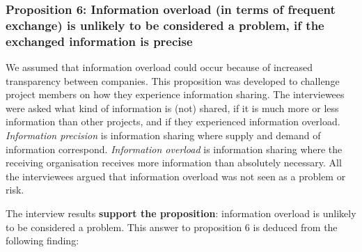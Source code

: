 \vspace{.2cm}
\subsubsection{Proposition 6: Information overload (in terms of frequent exchange) is unlikely to be considered a problem, if the exchanged information is precise}


We assumed that information overload could occur because of increased transparency between companies. This proposition was developed to challenge project members on how they experience information sharing. The interviewees were asked what kind of information is (not) shared, if it is much more or less information than other projects, and if they experienced information overload. {\em Information precision} is information sharing where supply and demand of information correspond. {\em Information overload} is information sharing where the receiving organisation receives more information than absolutely necessary. All the interviewees argued that information overload was not seen as a problem or risk.


%

The interview results {\bf support the proposition}: information overload is unlikely to be considered a problem. This answer to proposition 6 is deduced from the following finding:

